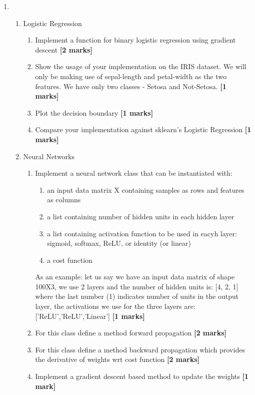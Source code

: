 \documentclass[colorlinks,linkcolor=true]{article}
\begin{document}
\begin{enumerate}



\item \begin{enumerate}
	
\item Logistic Regression
\begin{enumerate}
	\item Implement a function for binary logistic regression using gradient descent \textbf{[2 marks]}
	\item Show the usage of your implementation on the IRIS dataset. We will only be making use of sepal-length and petal-width as the two features. We have only two classes - Setosa and Not-Setosa.  \textbf{[1 marks]}
	\item Plot the decision boundary \textbf{[1 marks]}
	\item Compare your implementation against sklearn's Logistic Regression \textbf{[1 marks]}

\end{enumerate}

\item Neural Networks
\begin{enumerate}
	\item Implement a neural network class that can be instantiated with: 
	\begin{enumerate}
		\item an input data matrix X containing samples as rows and features as columns
		\item a list containing number of hidden units in each hidden layer
		\item a list containing activation function to be used in eacyh layer: sigmoid, softmax, ReLU, or identity (or linear)
		\item a cost function
	\end{enumerate} 
	As an example: let us say we have an input data matrix of shape 100X3, we use 2 layers and the number of hidden units is: [4, 2, 1] where the last number (1) indicates number of units in the output layer, the activations we use for the three layers are: ['ReLU','ReLU','Linear'] 
	 \textbf{[1 marks]}
	 \item For this class define a method forward propagation \textbf{[2 marks]}
	 \item For this class define a method backward propagation which provides the derivative of weights wrt cost function \textbf{[2 marks]}
	\item  Implement a gradient descent based method to update the weights \textbf{[1 mark]}
	

\end{enumerate}
\end{enumerate}
\end{enumerate}
\end{document}
